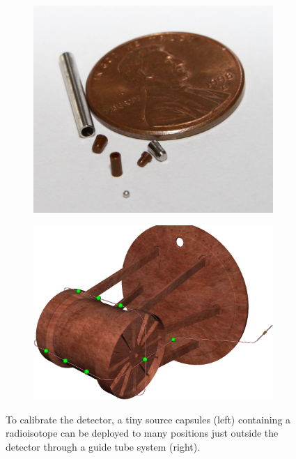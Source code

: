 \documentclass[herrin-thesis.tex]{subfiles}
\begin{document}
\begin{figure}[htb]
\centering
\begin{subfigure}[c]{0.33\linewidth}
\includegraphics[width=\textwidth]{./photos/source_capsule.png}
\end{subfigure}\hspace{0.05\linewidth}\hfill%
\begin{subfigure}[c]{0.60\linewidth}
\includegraphics[width=\textwidth]{./photos/calibration_tubing_cropped.png}
\end{subfigure}
\caption[The Calibration System]{To calibrate the detector, a tiny source capsules (left) containing a radioisotope can be deployed to many positions just outside the detector through a guide tube system (right).}
\label{fig:detector_calibration}
\end{figure}
\end{document}
